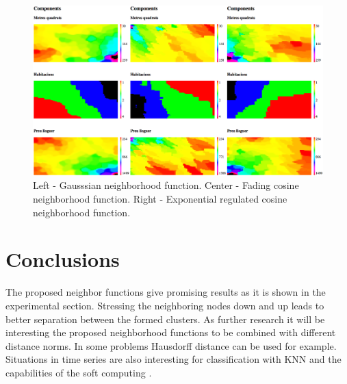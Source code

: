 \documentclass[runningheads]{llncs}
\begin{document}
\begin{figure}
\includegraphics[width=1.0\textwidth]{fig02.png}
\centering
\caption{Left - Gausssian neighborhood function. Center - Fading cosine neighborhood function. Right - Exponential regulated cosine neighborhood function.} \label{fig02}
\end{figure}
\FloatBarrier

\section{Conclusions}

The proposed neighbor functions give promising results as it is shown in the experimental section. Stressing the neighboring nodes down and up leads to better separation between the formed clusters. As further research it will be interesting the proposed neighborhood functions to be combined with different distance norms. In some problems Hausdorff distance can be used for example. Situations in time series \cite{atanasova01} are also interesting for classification with KNN and the capabilities of the soft computing \cite{angelova01}.
\end{document}
